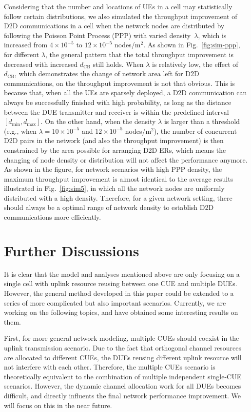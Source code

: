 \documentclass[journal, 10pt]{IEEEtran}
\begin{document}
Considering that the number and locations of UEs in a cell may
statistically follow certain distributions, we also simulated the
throughput improvement of D2D communications in a cell when the
network nodes are distributed by following the Poisson Point Process
(PPP) with varied density~$\lambda$, which is increased from $4\times
10^{-5}$ to $12\times 10^{-5}$ nodes/m$^2$. As shown in
Fig.~\ref{fig:sim-ppp}, for different $\lambda$, the general pattern
that the total throughput improvement is decreased with increased
$d_\mathrm{CB}$ still holds. When $\lambda$ is relatively low, the
effect of $d_\mathrm{CB}$, which demonstrates the change of network
area left for D2D communications, on the throughput improvement is not
that obvious. This is because that, when all the UEs are sparsely
deployed, a D2D communication can always be successfully finished with
high probability, as long as the distance between the DUE transmitter
and receiver is within the predefined interval $[d_{\min},d_{\max}]$.
On the other hand, when the density $\lambda$ is larger than a
threshold (e.g., when $\lambda = 10\times 10^{-5}$ and $12\times
10^{-5}$ nodes/m$^2$), the number of concurrent D2D pairs in the
network (and also the throughput improvement) is then constrained by
the area possible for arranging D2D ERs, which means the changing of
node density or distribution will not affect the performance anymore.
As shown in the figure, for network scenarios with high PPP density,
the maximum throughput improvement is almost identical to the average
results illustrated in Fig.~\ref{fig:sim5}, in which all the network
nodes are uniformly distributed with a high density. Therefore, for a
given network setting, there should always be a optimal range of
network density to establish D2D communications more efficiently.



\section{Further Discussions}\label{sec:dis}

It is clear that the model and analyses mentioned above are only
focusing on a single cell with uplink resource reusing between one CUE
and multiple DUEs. However, the general method developed in this paper
could be extended to a series of more complicated but also important
scenarios. Currently, we are working on the following topics, and have
obtained some interesting results on them. 
 

First, for more general network modeling, multiple CUEs should coexist
in the uplink transmission scenario. Due to the fact that orthogonal
channel resources are allocated to different CUEs, the DUEs reusing
different uplink resource will not interfere with each other.
Therefore, the multiple CUEs scenario is theoretically equivalent to
the combination of multiple independent single-CUE scenarios. However,
the dynamic channel allocation work for all DUEs becomes difficult,
and directly influents the final network performance improvement. We
will focus on this in the near future. 
\end{document}
